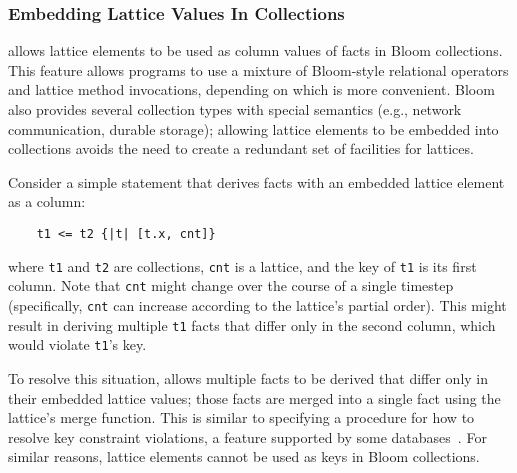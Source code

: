 \subsubsection{Embedding Lattice Values In Collections}
\label{sec:lattice-embedding}
\lang allows lattice elements to be used as column values of facts in Bloom
collections. This feature allows \lang programs to use a mixture of Bloom-style
relational operators and lattice method invocations, depending on which is more
convenient. Bloom also provides several collection types with special semantics
(e.g., network communication, durable storage); allowing lattice elements to be
embedded into collections avoids the need to create a redundant set of
facilities for lattices.

Consider a simple \lang statement that derives facts with an embedded lattice
element as a column:
\begin{verbatim}
    t1 <= t2 {|t| [t.x, cnt]}
\end{verbatim}
where \texttt{t1} and \texttt{t2} are collections, \texttt{cnt} is a lattice,
and the key of \texttt{t1} is its first column. Note that \texttt{cnt} might
change over the course of a single timestep (specifically, \texttt{cnt} can
increase according to the lattice's partial order). This might result in
deriving multiple \texttt{t1} facts that differ only in the second column, which
would violate \texttt{t1}'s key.

To resolve this situation, \lang allows multiple facts to be derived that differ
only in their embedded lattice values; those facts are merged into a single fact
using the lattice's merge function. This is similar to specifying a procedure
for how to resolve key constraint violations, a feature supported by some
databases~\cite{oracle-conflict,sqlite-on-conflict}. For similar reasons,
lattice elements cannot be used as keys in Bloom collections.%


